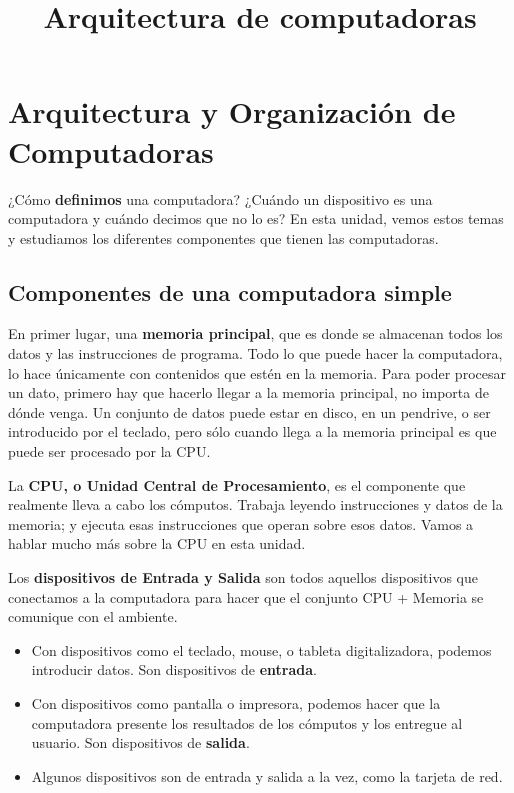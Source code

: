 \documentclass[spanish,A4,]{article}
\title{Arquitectura de computadoras}
\begin{document}
\maketitle

\section{Arquitectura y Organización de
Computadoras}\label{arquitectura-y-organizaciuxf3n-de-computadoras}

¿Cómo \textbf{definimos} una computadora? ¿Cuándo un dispositivo es una
computadora y cuándo decimos que no lo es? En esta unidad, vemos estos
temas y estudiamos los diferentes componentes que tienen las
computadoras.

\subsection{Componentes de una computadora
simple}\label{componentes-de-una-computadora-simple}

En primer lugar, una \textbf{memoria principal}, que es donde se
almacenan todos los datos y las instrucciones de programa. Todo lo que
puede hacer la computadora, lo hace únicamente con contenidos que estén
en la memoria. Para poder procesar un dato, primero hay que hacerlo
llegar a la memoria principal, no importa de dónde venga. Un conjunto de
datos puede estar en disco, en un pendrive, o ser introducido por el
teclado, pero sólo cuando llega a la memoria principal es que puede ser
procesado por la CPU.

La \textbf{CPU, o Unidad Central de Procesamiento}, es el componente que
realmente lleva a cabo los cómputos. Trabaja leyendo instrucciones y
datos de la memoria; y ejecuta esas instrucciones que operan sobre esos
datos. Vamos a hablar mucho más sobre la CPU en esta unidad.

Los \textbf{dispositivos de Entrada y Salida} son todos aquellos
dispositivos que conectamos a la computadora para hacer que el conjunto
CPU + Memoria se comunique con el ambiente.

\begin{itemize}
\itemsep1pt\parskip0pt
\item
  Con dispositivos como el teclado, mouse, o tableta digitalizadora,
  podemos introducir datos. Son dispositivos de \textbf{entrada}.
\item
  Con dispositivos como pantalla o impresora, podemos hacer que la
  computadora presente los resultados de los cómputos y los entregue al
  usuario. Son dispositivos de \textbf{salida}.
\item
  Algunos dispositivos son de entrada y salida a la vez, como la tarjeta
  de red.
\end{itemize}
\end{document}
